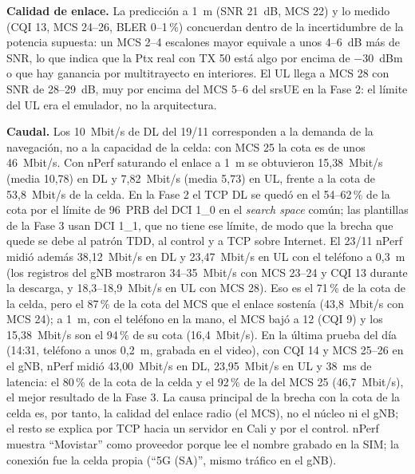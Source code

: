 \documentclass[conference]{IEEEtran}
\newcommand{\nperfdl}{15{,}38~Mbit/s (media 10{,}78)}
\newcommand{\nperful}{7{,}82~Mbit/s (media 5{,}73)}
\begin{document}
\textbf{Calidad de enlace.} La predicción a 1~m (SNR 21~dB, MCS 22) y lo medido (CQI 13, MCS 24--26, BLER 0--1\,\%) concuerdan dentro de la incertidumbre de la potencia supuesta: un MCS 2--4 escalones mayor equivale a unos 4--6~dB más de SNR, lo que indica que la Ptx real con TX 50 está algo por encima de $-30$~dBm o que hay ganancia por multitrayecto en interiores. El UL llega a MCS 28 con SNR de 28--29~dB, muy por encima del MCS 5--6 del srsUE en la Fase 2: el límite del UL era el emulador, no la arquitectura.

\textbf{Caudal.} Los 10~Mbit/s de DL del 19/11 corresponden a la demanda de la navegación, no a la capacidad de la celda: con MCS 25 la cota es de unos 46~Mbit/s. Con nPerf saturando el enlace a 1~m se obtuvieron \nperfdl{} en DL y \nperful{} en UL, frente a la cota de 53{,}8~Mbit/s de la celda. En la Fase 2 el TCP DL se quedó en el 54--62\,\% de la cota por el límite de 96~PRB del DCI 1\_0 en el \textit{search space} común; las plantillas de la Fase 3 usan DCI 1\_1, que no tiene ese límite, de modo que la brecha que quede se debe al patrón TDD, al control y a TCP sobre Internet. El 23/11 nPerf midió además 38{,}12~Mbit/s en DL y 23{,}47~Mbit/s en UL con el teléfono a 0{,}3~m (los registros del gNB mostraron 34--35~Mbit/s con MCS 23--24 y CQI 13 durante la descarga, y 18{,}3--18{,}9~Mbit/s en UL con MCS 28). Eso es el 71\,\% de la cota de la celda, pero el 87\,\% de la cota del MCS que el enlace sostenía (43{,}8~Mbit/s con MCS 24); a 1~m, con el teléfono en la mano, el MCS bajó a 12 (CQI 9) y los 15{,}38~Mbit/s son el 94\,\% de su cota (16{,}4~Mbit/s). En la última prueba del día (14:31, teléfono a unos 0{,}2~m, grabada en el video), con CQI 14 y MCS 25--26 en el gNB, nPerf midió 43{,}00~Mbit/s en DL, 23{,}95~Mbit/s en UL y 38~ms de latencia: el 80\,\% de la cota de la celda y el 92\,\% de la del MCS 25 (46{,}7~Mbit/s), el mejor resultado de la Fase 3. La causa principal de la brecha con la cota de la celda es, por tanto, la calidad del enlace radio (el MCS), no el núcleo ni el gNB; el resto se explica por TCP hacia un servidor en Cali y por el control. nPerf muestra ``Movistar'' como proveedor porque lee el nombre grabado en la SIM; la conexión fue la celda propia (``5G (SA)'', mismo tráfico en el gNB).
\end{document}
